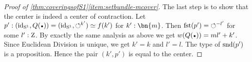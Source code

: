 \begin{proof}[Proof of \cref{thm:coveringsofS1}\ref{item:setbundle-mcover}]
The last step is to show that the center is indeed a center of contraction.
Let $p': (\id_\Sc,Q(\base))=(\id_\Sc,{\Sloop}^{k'})\jdeq f(k')$ for $k':\bn{m}$.
Then $\fst(p') = {\Sloop}^{-l'}$ for some $l':\mathrm{Z}$. By exactly
the same analysis as above we get $w(Q(\base)) = ml'+k'$. Since Euclidean Division
is unique, we get $k'=k$ and $l'=l$. The type of $\snd(p')$ is a proposition.
Hence the pair $(k',p')$ is equal to the center. 
\end{proof}

